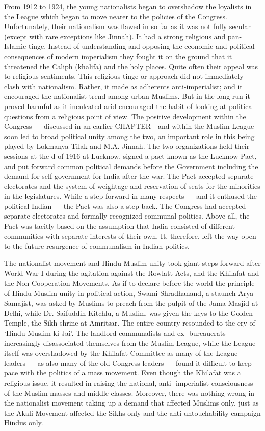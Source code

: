 From 1912 to 1924, the young nationalists began to overshadow the loyalists in the League which began to move nearer to the policies of the Congress. Unfortunately, their nationalism was flawed in so far as it was not fully secular (except with rare exceptions like Jinnah). It had a strong religious and pan-Islamic tinge. Instead of understanding and opposing the economic and political consequences of modern imperialism they fought it on the ground that it threatened the Caliph (khalifa) and the holy places. Quite often their appeal was to religious sentiments. This religious tinge or approach did not immediately clash with nationalism. Rather, it made as adherents anti-imperialist; and it encouraged the nationalist trend among urban Muslims. But in the long run it proved harmful as it inculcated arid encouraged the habit of looking at political questions from a religious point of view. The positive development within the Congress — discussed in an earlier CHAPTER - and within the Muslim League soon led to broad political unity among the two, an important role in this being played by Lokmanya Tilak and M.A. Jinnah. The two organizations held their sessions at the d of 1916 at Lucknow, signed a pact known as the Lucknow Pact, and put forward common political demands before the Government including the demand for self-government for India after the war. The Pact accepted separate electorates and the system of weightage and reservation of seats for the minorities in the legislatures. While a step forward in many respects — and it enthused the political Indian — the Pact was also a step back. The Congress had accepted separate electorates and formally recognized communal politics. Above all, the Pact was tacitly based on the assumption that India consisted of different communities with separate interests of their own. It, therefore, left the way open to the future resurgence of communalism in Indian politics. 

The nationalist movement and Hindu-Muslim unity took giant steps forward after World War I during the agitation against the Rowlatt Acts, and the Khilafat and the Non-Cooperation Movements. As if to declare before the world the principle of Hindu-Muslim unity in political action, Swami Shradhanand, a staunch Arya Samajist, was asked by Muslims to preach from the pulpit of the Jama Masjid at Delhi, while Dr. Saifuddin Kitchlu, a Muslim, was given the keys to the Golden Temple, the Sikh shrine at Amritsar. The entire country resounded to the cry of `Hindu-Muslim ki Jai'. The landlord-communalists and ex- bureaucrats increasingly disassociated themselves from the Muslim League, while the League itself was overshadowed by the Khilafat Committee as many of the League leaders — as also many of the old Congress leaders — found it difficult to keep pace with the politics of a mass movement. Even though the Khilafat was a religious issue, it resulted in raising the national, anti- imperialist consciousness of the Muslim masses and middle classes. Moreover, there was nothing wrong in the nationalist movement taking up a demand that affected Muslims only, just as the Akali Movement affected the Sikhs only and the anti-untouchability campaign Hindus only. 

